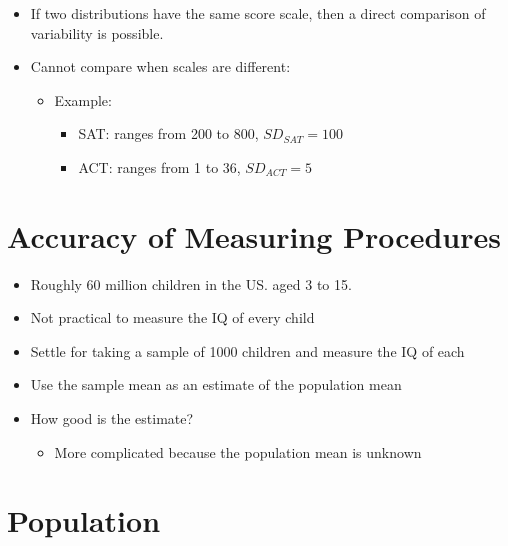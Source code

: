 \documentclass[12pt]{article}
\begin{document}
\begin{itemize}
\itemsep1pt\parskip0pt
\item
  If two distributions have the same score scale, then a direct
  comparison of variability is possible.
\item
  Cannot compare when scales are different:

  \begin{itemize}
  \itemsep1pt\parskip0pt
  \item
    Example:

    \begin{itemize}
    \itemsep1pt\parskip0pt
    \item
      SAT: ranges from 200 to 800, \(SD_{SAT} = 100\)
    \item
      ACT: ranges from 1 to 36, \(SD_{ACT} = 5\)
    \end{itemize}
  \end{itemize}
\end{itemize}

\section{Accuracy of Measuring
Procedures}\label{accuracy-of-measuring-procedures}

\begin{itemize}
\itemsep1pt\parskip0pt
\item
  Roughly 60 million children in the US. aged 3 to 15.
\item
  Not practical to measure the IQ of every child
\item
  Settle for taking a sample of 1000 children and measure the IQ of each
\item
  Use the sample mean as an estimate of the population mean
\item
  How good is the estimate?

  \begin{itemize}
  \itemsep1pt\parskip0pt
  \item
    More complicated because the population mean is unknown
  \end{itemize}
\end{itemize}

\section{Population}\label{population}
\end{document}
